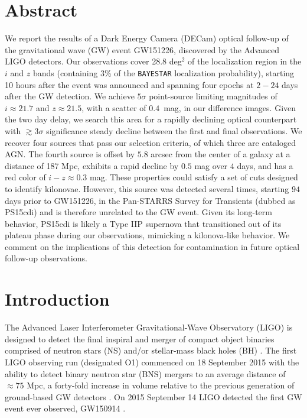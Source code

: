 \section*{Abstract} 
We report the results of a Dark Energy Camera (DECam)
optical follow-up of the gravitational wave (GW) event GW151226,
discovered by the Advanced LIGO detectors. Our observations cover 28.8
deg$^2$ of the localization region in the $i$ and $z$ bands (containing 3\% 
of the {\tt BAYESTAR} localization probability), starting 10 hours after the 
event was announced and spanning four epochs at $2-24$ days after the 
GW detection. We achieve $5\sigma$ point-source limiting 
magnitudes of $i\approx21.7$ and $z\approx21.5$, with a scatter
of $0.4$~mag, in our difference images. Given the two day delay, 
we search this area for a rapidly declining optical counterpart with
$\gtrsim 3\sigma$ significance steady decline between the first and final
observations. We recover four sources that pass our selection criteria, 
of which three are cataloged AGN. The fourth source is offset
by $5.8$ arcsec from the center of a galaxy at a distance of 187
Mpc, exhibits a rapid decline by $0.5$ mag over $4$ days,
and has a red color of $i-z\approx 0.3$ mag. These properties could satisfy
a set of cuts designed to identify kilonovae. However, this source
was detected several times, starting $94$ days prior to GW151226,  
in the Pan-STARRS Survey for Transients (dubbed as PS15cdi) and
is therefore unrelated to the GW event. Given its long-term 
behavior, PS15cdi is likely a Type IIP supernova that 
transitioned out of its plateau phase during our 
observations, mimicking a kilonova-like behavior. We comment on
the implications of this detection for contamination in future
optical follow-up observations. 

\section{Introduction}
\label{sec:ch4_intro}

The Advanced Laser Interferometer Gravitational-Wave Observatory
(LIGO) is designed to detect the final inspiral and
merger of compact object binaries comprised of neutron stars (NS)
and/or stellar-mass black holes (BH) \citep{LIGOMainRef}. 
The first LIGO observing run (designated O1)
commenced on 18 September 2015 with the ability to detect binary
neutron star (BNS) mergers to an average distance of $\approx 75$ Mpc, a
forty-fold increase in volume relative to the previous generation of
ground-based GW detectors \citep{Martynov+16}. On 2015 September 14 LIGO detected 
the first GW event ever observed, GW150914 \citep{LIGOGW150914}.


